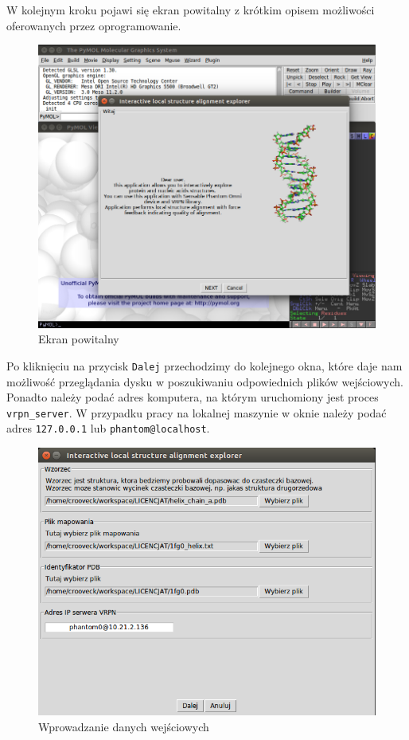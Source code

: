 \documentclass[licencjacka]{pracamgr}
\begin{document}
W kolejnym kroku pojawi się ekran powitalny z krótkim opisem możliwości oferowanych przez oprogramowanie.

\begin{figure}[H]
\centering
\includegraphics[scale=0.5,center]{explorer_hello_en}
\caption{Ekran powitalny}
\end{figure}

Po kliknięciu na przycisk \texttt{Dalej} przechodzimy do kolejnego okna, które daje nam możliwość przeglądania dysku w poszukiwaniu odpowiednich plików wejściowych. Ponadto należy podać adres komputera, na którym uruchomiony jest proces \texttt{vrpn\_server}. W przypadku pracy na lokalnej maszynie w oknie należy podać adres \texttt{127.0.0.1} lub \texttt{phantom@localhost}.

\begin{figure}[H]
\centering
\includegraphics[scale=0.7,center]{explorer_files_pl}
\caption{Wprowadzanie danych wejściowych}
\end{figure}
\end{document}
